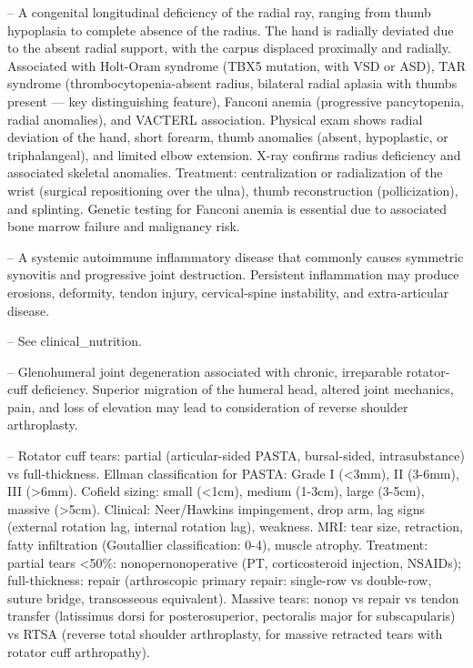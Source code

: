 -- A congenital longitudinal deficiency of the radial ray, ranging from thumb hypoplasia to complete absence of the radius. The hand is radially deviated due to the absent radial support, with the carpus displaced proximally and radially. Associated with Holt-Oram syndrome (TBX5 mutation, with VSD or ASD), TAR syndrome (thrombocytopenia-absent radius, bilateral radial aplasia with thumbs present — key distinguishing feature), Fanconi anemia (progressive pancytopenia, radial anomalies), and VACTERL association. Physical exam shows radial deviation of the hand, short forearm, thumb anomalies (absent, hypoplastic, or triphalangeal), and limited elbow extension. X-ray confirms radius deficiency and associated skeletal anomalies. Treatment: centralization or radialization of the wrist (surgical repositioning over the ulna), thumb reconstruction (pollicization), and splinting. Genetic testing for Fanconi anemia is essential due to associated bone marrow failure and malignancy risk.

-- A systemic autoimmune inflammatory disease that commonly causes symmetric synovitis and progressive joint destruction. Persistent inflammation may produce erosions, deformity, tendon injury, cervical-spine instability, and extra-articular disease.

-- See clinical\_nutrition.

-- Glenohumeral joint degeneration associated with chronic, irreparable rotator-cuff deficiency. Superior migration of the humeral head, altered joint mechanics, pain, and loss of elevation may lead to consideration of reverse shoulder arthroplasty.

-- Rotator cuff tears: partial (articular-sided PASTA, bursal-sided, intrasubstance) vs full-thickness. Ellman classification for PASTA: Grade I (<3mm), II (3-6mm), III (>6mm). Cofield sizing: small (<1cm), medium (1-3cm), large (3-5cm), massive (>5cm). Clinical: Neer/Hawkins impingement, drop arm, lag signs (external rotation lag, internal rotation lag), weakness. MRI: tear size, retraction, fatty infiltration (Goutallier classification: 0-4), muscle atrophy. Treatment: partial tears <50\%: nonopernonoperative (PT, corticosteroid injection, NSAIDs); full-thickness: repair (arthroscopic primary repair: single-row vs double-row, suture bridge, transosseous equivalent). Massive tears: nonop vs repair vs tendon transfer (latissimus dorsi for posterosuperior, pectoralis major for subscapularis) vs RTSA (reverse total shoulder arthroplasty, for massive retracted tears with rotator cuff arthropathy).

